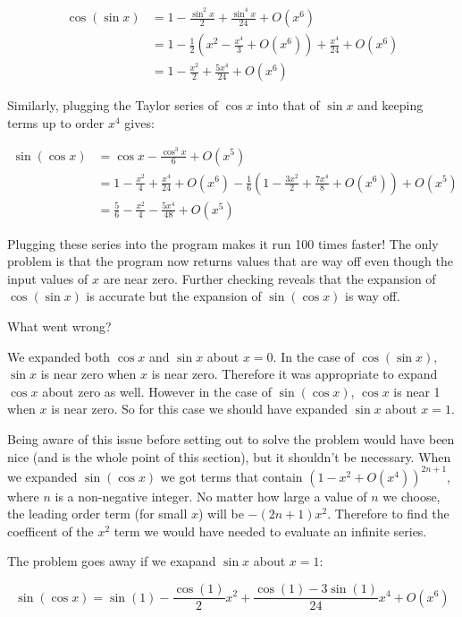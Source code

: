 \documentclass{article}
\begin{document}
\begin{align*}
    \cos(\sin x) &= 1 - \frac{\sin^2 x}{2} + \frac{\sin^4 x}{24} + O(x^6) \\
                 &= 1 - \frac{1}{2}(x^2 - \frac{x^4}{3} + O(x^6)) + \frac{x^4}{24} + O(x^6) \\
                 &= 1 - \frac{x^2}{2} + \frac{5x^4}{24} + O(x^6)
\end{align*}

\noindent Similarly, plugging the Taylor series of $\cos x$ into that of $\sin
x$ and keeping terms up to order $x^4$ gives:

\begin{align*}
    \sin(\cos x) &= \cos x - \frac{\cos^3 x}{6} + O(x^5) \\
                 &= 1 - \frac{x^2}{4} + \frac{x^4}{24} + O(x^6) - \frac{1}{6}(1-\frac{3x^2}{2}+\frac{7x^4}{8}+O(x^6)) + O(x^5)\\
                 &= \frac{5}{6} - \frac{x^2}{4} - \frac{5x^4}{48} + O(x^5)
\end{align*}

Plugging these series into the program makes it run 100 times faster! The only
problem is that the program now returns values that are way off even though the
input values of $x$ are near zero. Further checking reveals that the expansion
of $\cos(\sin x)$ is accurate but the expansion of $\sin(\cos x)$ is way off.

What went wrong?

We expanded both $\cos x$ and $\sin x$ about $x=0$. In the case of $\cos(\sin
x)$, $\sin x$ is near zero when $x$ is near zero. Therefore it was appropriate
to expand $\cos x$ about zero as well.  However in the case of $\sin(\cos x)$,
$\cos x$ is near 1 when $x$ is near zero. So for this case we should have
expanded $\sin x$ about $x=1$.

Being aware of this issue before setting out to solve the problem would have
been nice (and is the whole point of this section), but it shouldn't be
necessary. When we expanded $\sin(\cos x)$ we got terms that contain $(1 -
x^2+O(x^4))^{2n+1}$, where $n$ is a non-negative integer. No matter how large a
value of $n$ we choose, the leading order term (for small $x$) will be
$-(2n+1)x^2$. Therefore to find the coefficent of the $x^2$ term we would
have needed to evaluate an infinite series.

The problem goes away if we exapand $\sin x$ about $x=1$:

\[
    \sin(\cos x)= \sin(1)-\frac{\cos(1)}{2}x^2+\frac{\cos(1)- 3\sin(1)}{24}x^4+O(x^6)
\]
\end{document}
